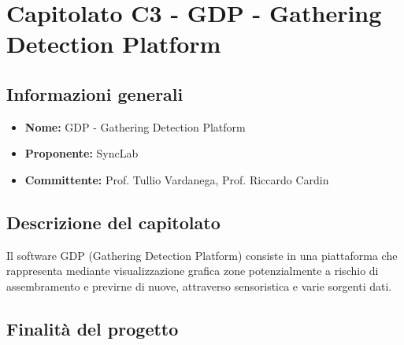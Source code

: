 \section{Capitolato C3 - GDP - Gathering Detection Platform}


\subsection{Informazioni generali}

\begin{itemize}
	\item{\textbf{Nome:}} GDP - Gathering Detection Platform
	\item{\textbf{Proponente:}} SyncLab
	\item{\textbf{Committente:}} Prof. Tullio Vardanega, Prof. Riccardo Cardin
\end{itemize}



\subsection{Descrizione del capitolato}

Il software GDP (Gathering Detection Platform) consiste in una piattaforma che rappresenta mediante visualizzazione grafica zone potenzialmente a rischio di assembramento e previrne di nuove, attraverso sensoristica e varie sorgenti dati.


\subsection{Finalità del progetto}

